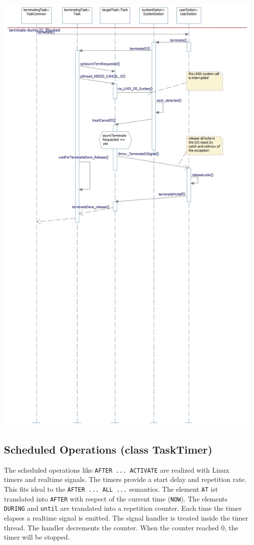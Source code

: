\includegraphics[width=15cm]{Linux_TerminateIO.jpg}



\subsection{Scheduled Operations (class TaskTimer)}
The scheduled operations like \verb|AFTER ... ACTIVATE| are realized with
Linux timers and realtime signals. 
The timers provide a start delay and repetition rate. This fits ideal to
the \verb|AFTER ... ALL ...| semantics.
The element \verb|AT| ist translated into \verb|AFTER| with respect of the current
time (\verb|NOW|).
The elements \verb|DURING| and \verb|until| are translated into a repetition 
counter. Each time the timer elapses a realtime signal is emitted.
The signal handler is treated inside the timer thread.
The handler decrements the counter.
When the counter reached 0, the timer will be stopped.

